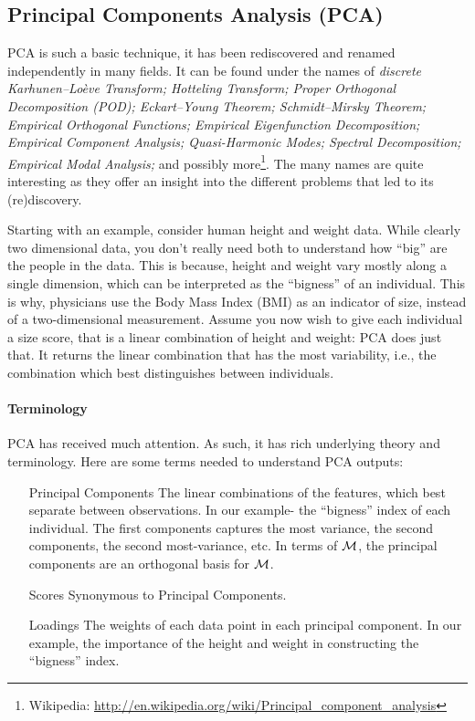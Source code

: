 \subsection{Principal Components Analysis (PCA)}
\label{sec:pca}

PCA is such a basic technique, it has been rediscovered and renamed independently in many fields. 
It can be found under the names of \emph{discrete Karhunen–Loève Transform; Hotteling Transform; Proper Orthogonal Decomposition (POD); Eckart–Young Theorem; Schmidt–Mirsky Theorem;  Empirical Orthogonal Functions; Empirical Eigenfunction Decomposition;  Empirical Component Analysis;  Quasi-Harmonic Modes;  Spectral Decomposition;  Empirical Modal Analysis;} and possibly more\footnote{Wikipedia: \url{http://en.wikipedia.org/wiki/Principal_component_analysis} }.
The many names are quite interesting as they offer an insight into the different problems that led to its (re)discovery.

Starting with an example, consider human height and weight data. 
While clearly two dimensional data, you don't really need both to understand how ``big'' are the people in the data. 
This is because, height and weight vary mostly along a single dimension, which can be interpreted as the ``bigness'' of an individual. 
This is why, physicians use the Body Mass Index (BMI) as an indicator of size, instead of a two-dimensional measurement.
Assume you now wish to give each individual a size score, that is a linear combination of height and weight: PCA does just that. It returns the linear combination that has the most variability, i.e., the combination which best distinguishes between individuals. 


\paragraph{Terminology}
PCA has received much attention. As such, it has rich underlying theory and terminology.
Here are some terms needed to understand PCA outputs:
\begin{itemize}
\item[Principal Components] The linear combinations of the features, which best separate between observations. In our example- the ``bigness'' index of each individual. The first components captures the most variance, the second components, the second most-variance, etc. In terms of $\mathcal{M}$, the principal components are an orthogonal basis for $\mathcal{M}$.
\item[Scores] Synonymous to Principal Components.
\item[Loadings] The weights of each data point in each principal component. In our example, the importance of the height and weight in constructing the ``bigness'' index.
\end{itemize}


